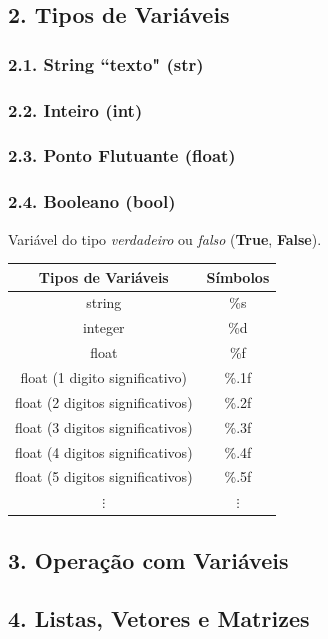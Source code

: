 \documentclass[a4paper]{book}
\begin{document}
		\subsection*{2. Tipos de Variáveis}
			\subsubsection*{2.1. String ``texto" (str)}
			
			\subsubsection*{2.2. Inteiro (int)}
			
			\subsubsection*{2.3. Ponto Flutuante (float)}
			
			\subsubsection*{2.4. Booleano (bool)}
				Variável do tipo \textit{verdadeiro} ou \textit{falso} (\textbf{True}, \textbf{False}).
		\begin{table}[H]
			\centering
			\begin{tabular}{|c|c|}
				\hline
				Tipos de Variáveis & Símbolos \\ \hline
				string & \%s \\
				integer & \%d\\
				float & \%f  \\
				float (1 digito significativo) & \%.1f \\
				float (2 digitos significativos) & \%.2f \\
				float (3 digitos significativos) & \%.3f \\
				float (4 digitos significativos) & \%.4f \\
				float (5 digitos significativos) & \%.5f \\
				$\vdots$ & $\vdots$ \\ \hline
			\end{tabular}
		\end{table}
		
		\subsection*{3. Operação com Variáveis}
			
		\subsection*{4. Listas, Vetores e Matrizes}
		
\end{document}
